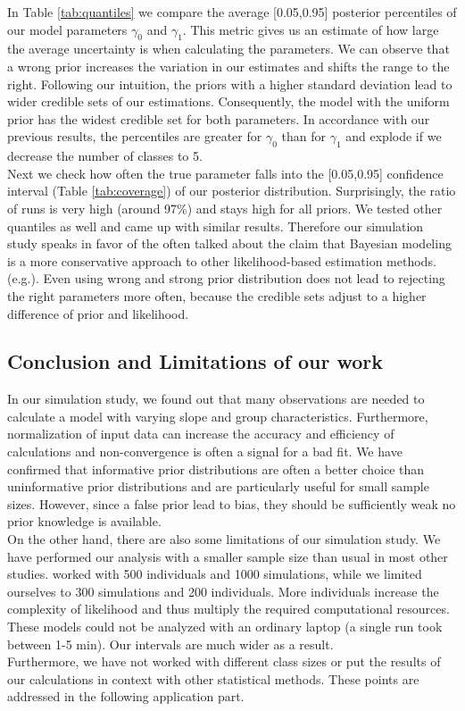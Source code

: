In Table \ref{tab:quantiles} we compare the average [0.05,0.95] posterior percentiles of our model parameters $\gamma_0$ and $\gamma_1$. 
This metric gives us an estimate of how large the average uncertainty is when calculating the parameters. We can observe that a wrong prior increases the variation in our estimates and shifts the range to the right. 
Following our intuition, the priors with a higher standard deviation lead to wider credible sets of our estimations. Consequently, the model with the uniform prior has the widest credible set for both parameters. In accordance with our previous results, the percentiles are greater for $\gamma_0$ than for $\gamma_1$ and explode if we decrease the number of classes to 5.\\
Next we check how often the true parameter falls into the [0.05,0.95] confidence interval (Table \ref{tab:coverage}) of our posterior distribution. Surprisingly, the ratio of runs is very high (around 97\%) and stays high for all priors.
We tested other quantiles as well and came up with similar results. Therefore our simulation study speaks in favor of the often talked about the claim that Bayesian modeling is a more conservative approach to other likelihood-based estimation methods.  (e.g.\cite{stegmueller2013}). Even using wrong and strong prior distribution does not lead to rejecting the right parameters more often, because the credible sets adjust to a higher difference of prior and likelihood.

\subsection{Conclusion and Limitations of our work}

In our simulation study, we found out that many observations are needed to calculate a model with varying slope and group characteristics. Furthermore, normalization of input data can increase the accuracy and efficiency of calculations and non-convergence is often a signal for a bad fit. We have confirmed that informative prior distributions are often a better choice than uninformative prior distributions and are particularly useful for small sample sizes. However, since a false prior lead to bias, they should be sufficiently weak no prior knowledge is available.\\
On the other hand, there are also some limitations of our simulation study. We have performed our analysis with a smaller sample size than usual in most other studies. \cite{stegmueller2013} worked with 500 individuals and 1000 simulations, while we limited ourselves to 300 simulations and 200 individuals. More individuals increase the complexity of likelihood and thus multiply the required computational resources. These models could not be analyzed with an ordinary laptop (a single run took between 1-5 min). Our intervals are much wider as a result. \\
Furthermore, we have not worked with different class sizes or put the results of our calculations in context with other statistical methods. These points are addressed in the following application part.





